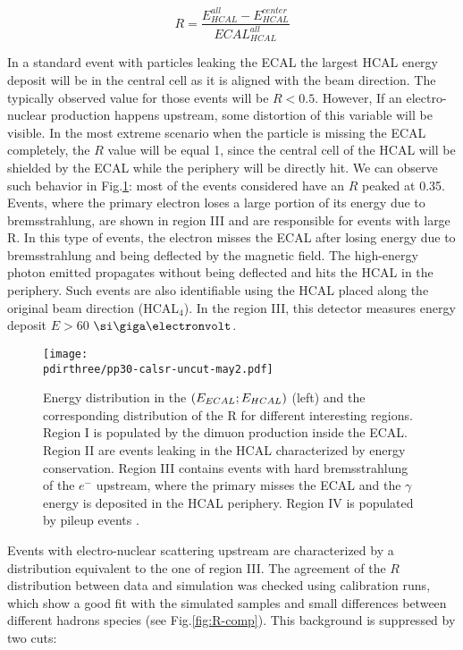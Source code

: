 \begin{equation}
  \label{eq:R-factor}
  R = \frac{E^{all}_{HCAL} - E^{center}_{HCAL}}{ECAL^{all}_{HCAL}}
\end{equation}

In a standard event with particles leaking the ECAL the largest HCAL energy deposit will be in the central cell as it is aligned with the beam direction. The typically observed value for those events will be $R<0.5$.
However, If an electro-nuclear production happens upstream, some distortion of this variable will be visible. In the most extreme scenario when the particle is missing the ECAL completely, the $R$ value will be equal 1, since the central cell of the HCAL will be shielded by the ECAL while the periphery will be directly hit. We can observe such behavior in Fig.\ref{fig:r-value-csample}: most of the events considered have an $R$ peaked at 0.35. Events, where the primary electron loses a large portion of its energy due to bremsstrahlung, are shown in region III and are responsible for events with large R. In this type of events, the electron misses the ECAL after losing energy due to bremsstrahlung and being deflected by the magnetic field. The high-energy photon emitted propagates without being deflected and hits the HCAL in the periphery. Such events are also identifiable using the HCAL placed along the original beam direction (HCAL$_4$). In the region III, this detector measures energy deposit $E>60$ $\gev$.

\begin{figure}[bth!]
  \centering
  \texttt{[image: \\pdirthree/pp30-calsr-uncut-may2.pdf]}
  \caption[R value for the control sample]{Energy distribution in the $(E_{ECAL};E_{HCAL})$ (left) and the corresponding distribution of the R for different interesting regions. Region I is populated by the dimuon production inside the ECAL. Region II are events leaking in the HCAL characterized by energy conservation. Region III contains events with hard bremsstrahlung of the $e^-$ upstream, where the primary misses the ECAL and the $\gamma$ energy is deposited in the HCAL periphery. Region IV is populated by pileup events \cite{pdegen-thesis}.}
  \label{fig:r-value-csample}
\end{figure}

Events with electro-nuclear scattering upstream are characterized by a distribution equivalent to the one of region III. The agreement of the $R$ distribution between data and simulation was checked using calibration runs, which show a good fit with the simulated samples and small differences between different hadrons species (see Fig.\ref{fig:R-comp}). This background is suppressed by two cuts:

